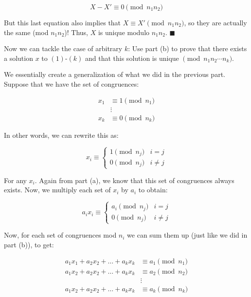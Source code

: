 \documentclass[11pt]{article}
\begin{document}
\begin{Parts}
\begin{solution}
    \[ X - X' \equiv 0 \pmod{n_1n_2}\] 

    But this last equation also implies that $X \equiv X' \pmod{n_1n_2}$, so they are actually the same (mod $n_1n_2$)! Thus, $X$ is unique modulo $n_1n_2$. $\blacksquare$
\end{solution}

\Part Now we can tackle the case of arbitrary $k$: Use part (b) to prove that there exists
a solution $x$ to $(1)$-$(k)$ and that this solution is unique $\pmod{n_1 n_2 \cdots n_k}$.

\begin{solution}
    We essentially create a generalization of what we did in the previous part. Suppose that we have the set of congruences:

    \begin{align*}
        x_1 &\equiv 1 \pmod{n_1}\\
        &\vdots\\
        x_k &\equiv 0 \pmod{n_k} 
    \end{align*}

    In other words, we can rewrite this as:

    \[         
    x_i \equiv \begin{cases}
            1 \pmod{n_j} &i = j\\
            0 \pmod{n_j} & i \neq j
        \end{cases}
    \]

    For any $x_i$. Again from part (a), we know that this set of congruences always exists. Now, we multiply each set of $x_i$ by $a_i$ to obtain:
    
    \[ 
        a_i x_i \equiv \begin{cases}
            a_i \pmod{n_j} & i = j\\
            0 \pmod{n_j} & i \neq j
        \end{cases}
    \]

    Now, for each set of congruences mod $n_i$ we can sum them up (just like we did in part (b)), to get:

    \begin{align*}
        a_1x_1 + a_2x_2 + \dots + a_kx_k &\equiv a_1 \pmod{n_1}\\
        a_1x_2 + a_2x_2 + \dots + a_kx_k &\equiv a_2 \pmod{n_2}\\
        &\vdots \\
        a_1x_2 + a_2x_2 + \dots + a_kx_k &\equiv a_k \pmod{n_k}
    \end{align*}


\end{solution}
\end{Parts}
\end{document}
